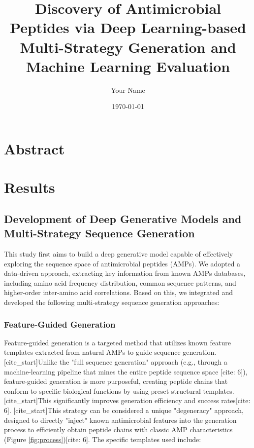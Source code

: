 \documentclass{article}
\title{Discovery of Antimicrobial Peptides via Deep Learning-based Multi-Strategy Generation and Machine Learning Evaluation}
\author{Your Name}
\date{\today}
\begin{document}
\maketitle

\section*{Abstract}

\section{Results}

\subsection{Development of Deep Generative Models and Multi-Strategy Sequence Generation}
This study first aims to build a deep generative model capable of effectively exploring the sequence space of antimicrobial peptides (AMPs). We adopted a data-driven approach, extracting key information from known AMPs databases, including amino acid frequency distribution, common sequence patterns, and higher-order inter-amino acid correlations. Based on this, we integrated and developed the following multi-strategy sequence generation approaches:

\subsubsection{Feature-Guided Generation}
Feature-guided generation is a targeted method that utilizes known feature templates extracted from natural AMPs to guide sequence generation. [cite_start]Unlike the "full sequence generation" approach (e.g., through a machine-learning pipeline that mines the entire peptide sequence space [cite: 6]), feature-guided generation is more purposeful, creating peptide chains that conform to specific biological functions by using preset structural templates. [cite_start]This significantly improves generation efficiency and success rates[cite: 6]. [cite_start]This strategy can be considered a unique "degeneracy" approach, designed to directly "inject" known antimicrobial features into the generation process to efficiently obtain peptide chains with classic AMP characteristics (Figure \ref{fig:process})[cite: 6]. The specific templates used include:
\end{document}
